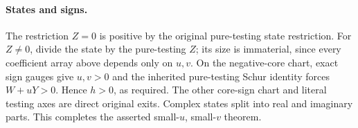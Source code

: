 \paragraph{States and signs.}
The restriction $Z=0$ is positive by the original pure-testing state
restriction. For $Z\ne0$, divide the state by the pure-testing $Z$;
its size is immaterial, since every coefficient array above depends
only on $u,v$. On the negative-core chart, exact sign gauges give
$u,v>0$ and the inherited pure-testing Schur identity forces
$W+uY>0$. Hence $h>0$, as required. The other core-sign chart and
literal testing axes are direct original exits. Complex states
split into real and imaginary parts. This completes the asserted
small-$u$, small-$v$ theorem.

